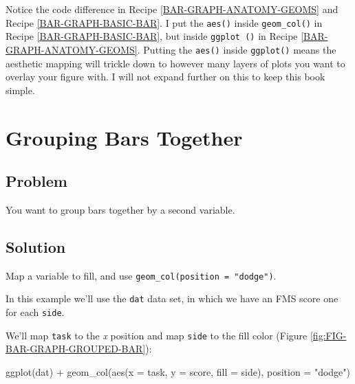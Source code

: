 \documentclass[
]{book}
\newenvironment{Shaded}{\begin{snugshade}}{\end{snugshade}}
\newcommand{\AttributeTok}[1]{\textcolor[rgb]{0.77,0.63,0.00}{#1}}
\newcommand{\FunctionTok}[1]{\textcolor[rgb]{0.00,0.00,0.00}{#1}}
\newcommand{\NormalTok}[1]{#1}
\newcommand{\SpecialCharTok}[1]{\textcolor[rgb]{0.00,0.00,0.00}{#1}}
\newcommand{\StringTok}[1]{\textcolor[rgb]{0.31,0.60,0.02}{#1}}
\begin{document}
Notice the code difference in Recipe \ref{BAR-GRAPH-ANATOMY-GEOMS} and Recipe \ref{BAR-GRAPH-BASIC-BAR}. I put the \texttt{aes()} inside \texttt{geom\_col()} in Recipe \ref{BAR-GRAPH-BASIC-BAR}, but inside \texttt{ggplot\ ()} in Recipe \ref{BAR-GRAPH-ANATOMY-GEOMS}. Putting the \texttt{aes()} inside \texttt{ggplot()} means the aesthetic mapping will trickle down to however many layers of plots you want to overlay your figure with. I will not expand further on this to keep this book simple.

\hypertarget{BAR-GRAPH-GROUPED-BAR}{%
\section{Grouping Bars Together}\label{BAR-GRAPH-GROUPED-BAR}}

\hypertarget{problem-16}{%
\subsection{Problem}\label{problem-16}}

You want to group bars together by a second variable.

\hypertarget{solution-16}{%
\subsection{Solution}\label{solution-16}}

Map a variable to fill, and use \texttt{geom\_col(position\ =\ "dodge")}.

In this example we'll use the \texttt{dat} data set, in which we have an FMS score one for each \texttt{side}.

We'll map \texttt{task} to the \emph{x} position and map \texttt{side} to the fill color (Figure \ref{fig:FIG-BAR-GRAPH-GROUPED-BAR}):

\begin{Shaded}
\begin{Highlighting}[]
\FunctionTok{ggplot}\NormalTok{(dat) }\SpecialCharTok{+}
  \FunctionTok{geom\_col}\NormalTok{(}\FunctionTok{aes}\NormalTok{(}\AttributeTok{x =}\NormalTok{ task, }\AttributeTok{y =}\NormalTok{ score, }\AttributeTok{fill =}\NormalTok{ side), }\AttributeTok{position =} \StringTok{"dodge"}\NormalTok{)}
\end{Highlighting}
\end{Shaded}
\end{document}
